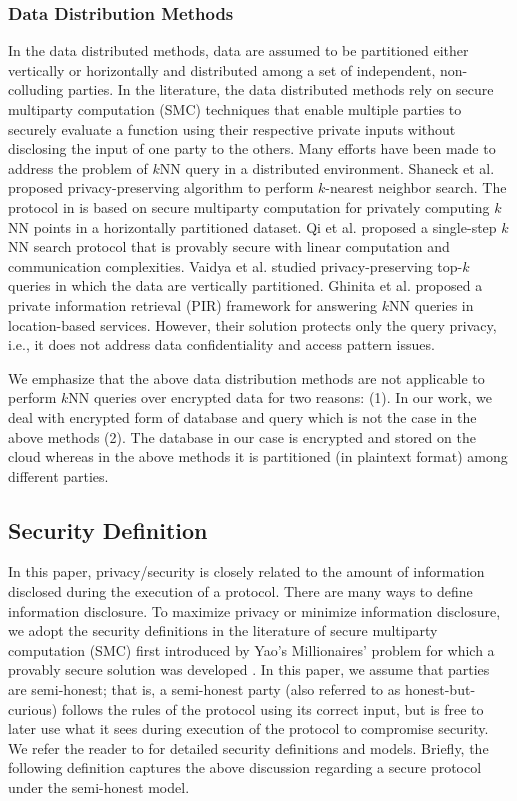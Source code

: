 \documentclass{article}
\begin{document}
\subsubsection{Data Distribution Methods}
In the data distributed methods, data are assumed to be partitioned either 
vertically or horizontally and distributed among a set of independent, 
non-colluding parties. 
In the literature, the data distributed methods 
rely on secure multiparty computation (SMC) techniques 
that enable multiple parties to securely evaluate a function using their respective 
private inputs without disclosing the input of one party to the others. Many 
efforts have been made to address the problem of $k$NN query in a distributed 
environment. Shaneck et al.\cite{shaneck2009privacy} proposed privacy-preserving algorithm to perform  
$k$-nearest neighbor search.
The protocol in\cite{shaneck2009privacy} is based on secure multiparty computation for privately 
computing $k$NN points in a horizontally partitioned dataset. 
Qi et al.\cite{qi2008efficient} proposed a single-step $k$NN search protocol that 
is provably secure with linear computation and communication complexities. 
Vaidya et al.\cite{vaidya2005privacy} studied privacy-preserving top-$k$ queries in which the data are vertically partitioned. 
Ghinita et al.\cite{ghinita2008private} proposed a private information retrieval (PIR) framework 
for answering $k$NN queries in location-based services. However, 
their solution protects only the query privacy, i.e., it does not address data confidentiality and access 
pattern issues. 

We emphasize that the above data distribution methods are not 
applicable to perform $k$NN queries over encrypted data for two reasons: (1). 
In our work, we deal with encrypted form of database and query 
which is not the case in the above methods (2). The 
database in our case is encrypted and stored on the cloud 
whereas in the above methods it is partitioned (in plaintext format) 
among different parties.
\subsection{Security Definition}
In this paper, 
privacy/security is closely related to the 
amount of information disclosed during the execution of a protocol. 
There are many ways to define information disclosure. To maximize privacy or 
minimize information disclosure, we adopt the security definitions in the literature 
of secure multiparty computation (SMC) first introduced by Yao's Millionaires' problem
for which a provably secure
solution was developed \cite{Yao82,Yao86}.
In this paper, we assume that parties are
semi-honest; that is,
a semi-honest party (also referred to as honest-but-curious)
follows the rules of the protocol using its correct input,
but is free to later use what it sees during execution of the protocol
to compromise security. We refer the reader to \cite{smc-2004,Goldreichnc} 
for detailed security definitions and models. Briefly, the following 
definition captures the above discussion
regarding a secure protocol under the semi-honest model.
\end{document}

